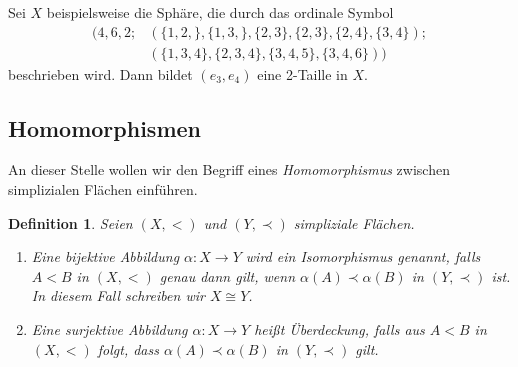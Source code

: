\documentclass[12pt,titlepage,twoside,cleardoublepage]{article}
\theoremstyle{nummermitklammern}
\newtheorem{definition}[temp]{Definition}
\newtheorem{definition}[zahl]{Definition}
\numberwithin{equation}{section}
\begin{document}
Sei $X$ beispielsweise die Sphäre, die durch das ordinale Symbol
\begin{align*}
(4,6,2;&(\{1,2,\},\{1,3,\},\{2,3\},\{2,3\},\{2,4\},\{3,4\});\\&(\{1,3,4\},\{2,3,4\},\{3,4,5\},\{3,4,6\}))
\end{align*}
beschrieben wird. Dann bildet $(e_3,e_4)$ eine 2-Taille in $X$.

\subsection{Homomorphismen}
An dieser Stelle wollen wir den Begriff eines \emph{Homomorphismus} zwischen simplizialen Flächen einführen.
\begin{definition} Seien $(X,<)$ und $(Y,\prec)$ simpliziale Flächen.
\begin{enumerate}
 \item Eine bijektive Abbildung $\alpha: X \to Y$ wird ein \emph{Isomorphismus} genannt, falls $A<B$ in $(X,<)$ genau dann gilt, wenn $\alpha(A) \prec \alpha(B)$ in $(Y,\prec)$  ist. In diesem Fall schreiben wir $X \cong Y$.
\item Eine surjektive Abbildung $\alpha: X \to Y$ heißt \emph{Überdeckung}, falls aus $A<B$ in $(X,<)$ folgt, dass $\alpha(A) \prec \alpha(B)$ in $(Y,\prec)$ gilt. 
\end{enumerate}
\end{definition}
\end{document}
